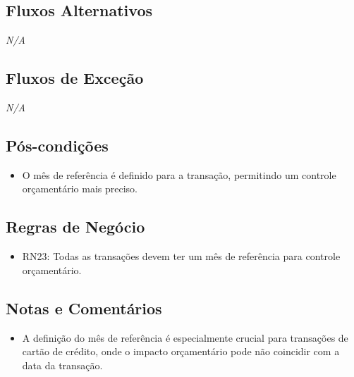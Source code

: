 \subsection*{Fluxos Alternativos}
\textit{N/A}

\subsection*{Fluxos de Exceção}
\textit{N/A}

\subsection*{Pós-condições}
\begin{addmargin}[1.5cm]{0cm}
	\begin{itemize}
		\item O mês de referência é definido para a transação, permitindo um controle orçamentário mais preciso.
	\end{itemize}
\end{addmargin}

\subsection*{Regras de Negócio}
\begin{addmargin}[1.5cm]{0cm}
	\begin{itemize}
		\item RN23: Todas as transações devem ter um mês de referência para controle orçamentário.
	\end{itemize}
\end{addmargin}

\subsection*{Notas e Comentários}
\begin{addmargin}[1.5cm]{0cm}
	\begin{itemize}
		\item A definição do mês de referência é especialmente crucial para transações de cartão de crédito, onde o impacto orçamentário pode não coincidir com a data da transação.
	\end{itemize}
\end{addmargin}
